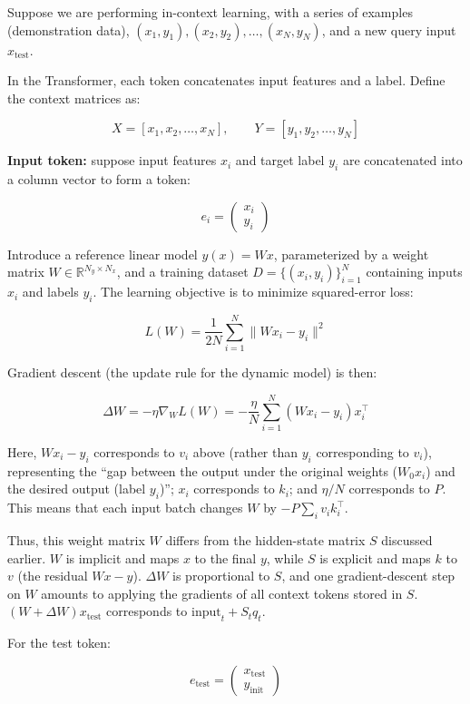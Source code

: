 Suppose we are performing in-context learning, with a series of examples (demonstration data), \((x_1,y_1),(x_2,y_2),\ldots,(x_N,y_N)\), and a new query input \(x_{\mathrm{test}}\).

In the Transformer, each token concatenates input features and a label. Define the context matrices as:

\[
X=[x_1,x_2,\ldots,x_N],\qquad Y=[y_1,y_2,\ldots,y_N]
\]

\textbf{Input token:} suppose input features \(x_i\) and target label \(y_i\) are concatenated into a column vector to form a token:

\[
e_i=\begin{pmatrix}x_i\\y_i\end{pmatrix}
\]

Introduce a reference linear model \(y(x)=Wx\), parameterized by a weight matrix \(W\in\mathbb{R}^{N_y\times N_x}\), and a training dataset \(D=\{(x_i,y_i)\}_{i=1}^{N}\) containing inputs \(x_i\) and labels \(y_i\). The learning objective is to minimize squared-error loss:

\[
L(W)=\frac{1}{2N}\sum_{i=1}^{N}\|Wx_i-y_i\|^2
\]

Gradient descent (the update rule for the dynamic model) is then:

\[
\Delta W=-\eta\nabla_W L(W)=-\frac{\eta}{N}\sum_{i=1}^{N}(Wx_i-y_i)x_i^\top
\tag{3}
\]

Here, \(Wx_i-y_i\) corresponds to \(v_i\) above (rather than \(y_i\) corresponding to \(v_i\)), representing the ``gap between the output under the original weights (\(W_0x_i\)) and the desired output (label \(y_i\))''; \(x_i\) corresponds to \(k_i\); and \(\eta/N\) corresponds to \(P\). This means that each input batch changes \(W\) by \(-P\sum_i v_i k_i^\top\).

Thus, this weight matrix \(W\) differs from the hidden-state matrix \(S\) discussed earlier. \(W\) is implicit and maps \(x\) to the final \(y\), while \(S\) is explicit and maps \(k\) to \(v\) (the residual \(Wx-y\)). \(\Delta W\) is proportional to \(S\), and one gradient-descent step on \(W\) amounts to applying the gradients of all context tokens stored in \(S\). \((W+\Delta W)x_{\mathrm{test}}\) corresponds to \(\mathrm{input}_t+S_tq_t\).

For the test token:

\[
e_{\mathrm{test}}=\begin{pmatrix}x_{\mathrm{test}}\\y_{\mathrm{init}}\end{pmatrix}
\]

